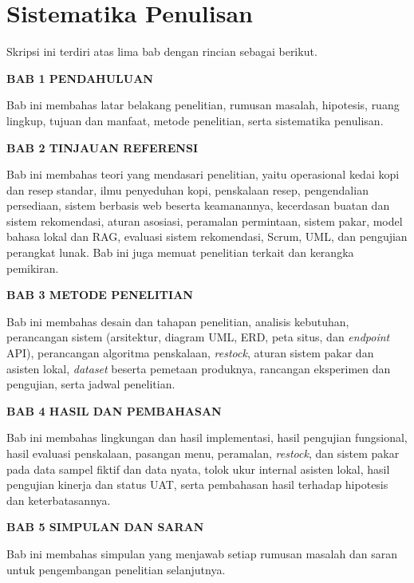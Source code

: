 \section{Sistematika Penulisan}
\label{sec:sistematika}

Skripsi ini terdiri atas lima bab dengan rincian sebagai berikut.

\textbf{BAB 1 PENDAHULUAN}

Bab ini membahas latar belakang penelitian, rumusan masalah, hipotesis, ruang lingkup, tujuan dan manfaat, metode penelitian, serta sistematika penulisan.

\textbf{BAB 2 TINJAUAN REFERENSI}

Bab ini membahas teori yang mendasari penelitian, yaitu operasional kedai kopi dan resep standar, ilmu penyeduhan kopi, penskalaan resep, pengendalian persediaan, sistem berbasis web beserta keamanannya, kecerdasan buatan dan sistem rekomendasi, aturan asosiasi, peramalan permintaan, sistem pakar, model bahasa lokal dan RAG, evaluasi sistem rekomendasi, Scrum, UML, dan pengujian perangkat lunak. Bab ini juga memuat penelitian terkait dan kerangka pemikiran.

\textbf{BAB 3 METODE PENELITIAN}

Bab ini membahas desain dan tahapan penelitian, analisis kebutuhan, perancangan sistem (arsitektur, diagram UML, ERD, peta situs, dan \textit{endpoint} API), perancangan algoritma penskalaan, \textit{restock}, aturan sistem pakar dan asisten lokal, \textit{dataset} beserta pemetaan produknya, rancangan eksperimen dan pengujian, serta jadwal penelitian.

\textbf{BAB 4 HASIL DAN PEMBAHASAN}

Bab ini membahas lingkungan dan hasil implementasi, hasil pengujian fungsional, hasil evaluasi penskalaan, pasangan menu, peramalan, \textit{restock}, dan sistem pakar pada data sampel fiktif dan data nyata, tolok ukur internal asisten lokal, hasil pengujian kinerja dan status UAT, serta pembahasan hasil terhadap hipotesis dan keterbatasannya.

\textbf{BAB 5 SIMPULAN DAN SARAN}

Bab ini membahas simpulan yang menjawab setiap rumusan masalah dan saran untuk pengembangan penelitian selanjutnya.
